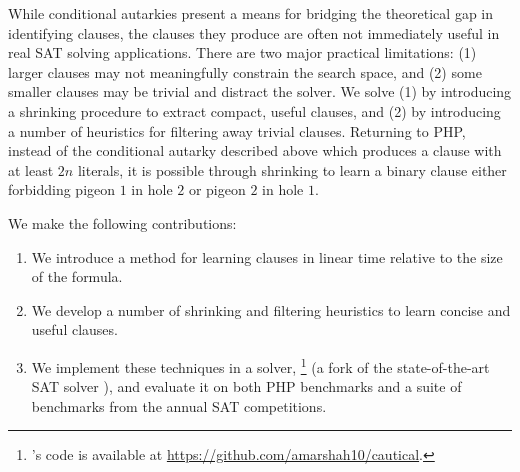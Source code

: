 While conditional autarkies present a means for bridging the theoretical gap in
identifying \pr clauses, the \pr clauses they produce are often not immediately useful
in real SAT solving applications. There are two major practical limitations: (1)
larger \pr clauses may not meaningfully constrain the search space, and (2) some
smaller \pr clauses may be trivial and distract the solver. We solve (1) by
introducing a shrinking procedure to extract compact, useful \pr clauses, and
(2) by introducing a number of heuristics for filtering away trivial \pr
clauses. Returning to PHP, instead of the conditional autarky described above
which produces a clause with at least $2n$ literals, it is possible through
shrinking to learn a binary \pr clause either forbidding pigeon $1$ in hole $2$ or
pigeon $2$ in hole $1$.


We make the following contributions: 

\begin{enumerate} 
    \item We introduce a method for learning \pr clauses in linear time relative to the
    size of the formula. 
    \item We develop a number of shrinking and filtering heuristics to learn
    concise and useful \pr clauses.%
    \item We implement these techniques in a solver, \tool\footnote{\tool's code
    is available at \url{https://github.com/amarshah10/cautical}.} (a fork of
    the state-of-the-art SAT solver \cadical), and evaluate it on both PHP benchmarks 
    and a suite of benchmarks from the annual SAT competitions.
\end{enumerate}